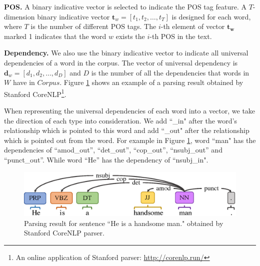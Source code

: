 \textbf{POS.}
A binary indicative vector is selected to indicate the POS tag feature.
A $T$-dimension binary indicative vector $\mathbf{t}_w=[t_1, t_2,\dots, t_T]$ is designed for each word, where $T$ is the number of different POS tags. The $i$-th element of vector $\mathbf{t_w}$ marked 1 indicates that the word $w$ exists the $i$-th POS in the text.

\textbf{Dependency.}
We also use the binary indicative vector to indicate all universal dependencies of a word in the corpus.
The vector of universal dependency is $\mathbf{d}_w=[d_1, d_2, \dots, d_D]$ and $D$ is the number of all the dependencies that words in $W$ have in $Corpus$.
Figure \ref{fig:parser} shows an example of a parsing result obtained by Stanford CoreNLP\footnote{An online application of Stanford parser: \url{http://corenlp.run/}}.

When representing the universal dependencies of each word into a vector, we take the direction of each type into consideration.
We add ``\_in" after the word's relationship which is pointed to this word and add ``\_out" after the relationship which is pointed out from the word.
For example in Figure \ref{fig:parser}, 
word ``man" has the dependencies of ``amod\_out'', ``det\_out'', ``cop\_out'', ``nsubj\_out'' and ``punct\_out''.
While word ``He'' has the dependency of ``nsubj\_in".
\begin{figure}[th]
	\centering
	\setlength{\abovecaptionskip}{0pt}
	\setlength{\belowcaptionskip}{0pt}
	\includegraphics[width=0.5\linewidth]{pic/parsing.eps}
	\caption{Parsing result for sentence ``He is a handsome man." obtained by Stanford CoreNLP parser.}
	\label{fig:parser}
\end{figure}

